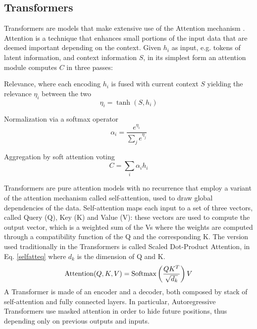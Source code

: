 \documentclass[conference]{IEEEtran}
\begin{document}
\subsection{Transformers}
Transformers \cite{transformer} are models that make extensive use of the Attention mechanism \cite{attention}. Attention is a technique that enhances small portions of the input data that are deemed important depending on the context. Given $h_i$ as input, e.g. tokens of latent information, and context information $S$, in its simplest form an attention module computes $C$ in three passes:
\begin{list}{-}{}
	\item Relevance, where each encoding $h_i$ is fused with current context $S$ yielding the relevance $\eta_i$ between the two
	\begin{equation}
	\eta_i = \tanh(S, h_i)
	\label{attentionrelevance}
	\end{equation}
	\item Normalization via a softmax operator
	\begin{equation}
	\alpha_i = \frac{e^{\eta_i}}{\sum_j e^{\eta_j}}
	\label{attentionnormalization}
	\end{equation}
	\item Aggregation by soft attention voting
	\begin{equation}
	C = \sum_i\alpha_ih_i
	\label{attentionaggregation}
	\end{equation}
\end{list}
Transformers are pure attention models with no recurrence that employ a variant of the attention mechanism called self-attention, used to draw global dependencies of the data. Self-attention maps each input to a set of three vectors, called Query (Q), Key (K) and Value (V): these vectors are used to compute the output vector, which is a weighted sum of the Vs where the weights are computed through a compatibility function of the Q and the corresponding K. The version used traditionally in the Transformers is called Scaled Dot-Product Attention, in Eq. \ref{selfatteq} where $d_k$ is the dimension of Q and K.
\begin{equation}
\hbox{Attention}(Q, K, V) = \hbox{Softmax}\left(\frac{QK^T}{\sqrt{d_k}}\right)V
\label{selfatteq}
\end{equation}
A Transformer is made of an encoder and a decoder, both composed by stack of self-attention and fully connected layers. In particular, Autoregressive Transformers use masked attention in order to hide future positions, thus depending only on previous outputs and inputs.\\
\end{document}
